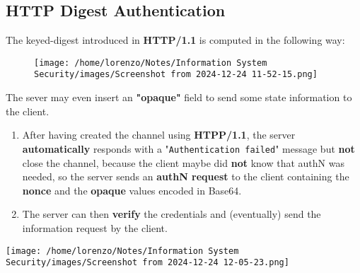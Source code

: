 \subsection{HTTP Digest Authentication}
The keyed-digest introduced in \textbf{HTTP/1.1} is computed in the following way:
\begin{figure}[h]
    \centering
    \texttt{[image: /home/lorenzo/Notes/Information System Security/images/Screenshot from 2024-12-24 11-52-15.png]}
\end{figure}
\noindent
The sever may even insert an \textbf{"opaque"} field to send some state information to the client.
\\
\begin{minipage}{0.7\textwidth}
    \begin{enumerate}
        \item After having created the channel using \textbf{HTPP/1.1}, the server \textbf{automatically} responds with a "\texttt{Authentication failed}" message but \textbf{not} close the channel, because the client maybe did \textbf{not} know that authN was needed, so the server sends an \textbf{authN request} to the client containing the \textbf{nonce} and the \textbf{opaque} values encoded in Base64.
        \item The server can then \textbf{verify} the credentials and (eventually) send the information request by the client.
    \end{enumerate} 
\end{minipage} 
\hspace{1cm}
\begin{minipage}{0.3\textwidth}
    \centering
    \texttt{[image: /home/lorenzo/Notes/Information System Security/images/Screenshot from 2024-12-24 12-05-23.png]}
\end{minipage}
